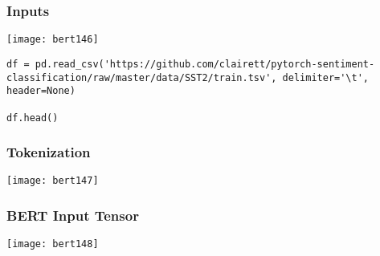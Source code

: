\begin{frame}[fragile]\frametitle{Inputs}



			\begin{center}
			\texttt{[image: bert146]}
			\end{center}	

\begin{lstlisting}
df = pd.read_csv('https://github.com/clairett/pytorch-sentiment-classification/raw/master/data/SST2/train.tsv', delimiter='\t', header=None)

df.head()
\end{lstlisting}


\end{frame}

\begin{frame}[fragile]\frametitle{Tokenization}


			\begin{center}
			\texttt{[image: bert147]}
			\end{center}	


\end{frame}

\begin{frame}[fragile]\frametitle{BERT Input Tensor}

			\begin{center}
			\texttt{[image: bert148]}
			\end{center}	


\end{frame}

